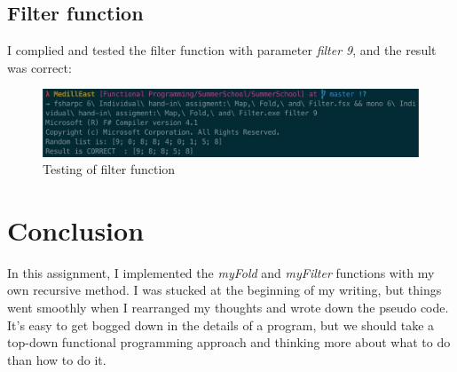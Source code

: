 \documentclass[sigconf]{acmart}
\begin{document}
\subsection{Filter function}

I complied and tested the filter function with parameter \emph{filter 9}, and the result was correct:

\begin{figure}[h]
      \centering
      \includegraphics[width=\linewidth]{aaafiles/filter}
      \caption{Testing of filter function}
      \label{fig:filter}
\end{figure}

\section{Conclusion}

In this assignment, I implemented the \emph{myFold} and \emph{myFilter} functions with my own recursive method. I was stucked at the beginning of my writing, but things went smoothly when I rearranged my thoughts and wrote down the pseudo code. It's easy to get bogged down in the details of a program, but we should take a top-down functional programming approach and thinking more about what to do than how to do it.


\end{document}
